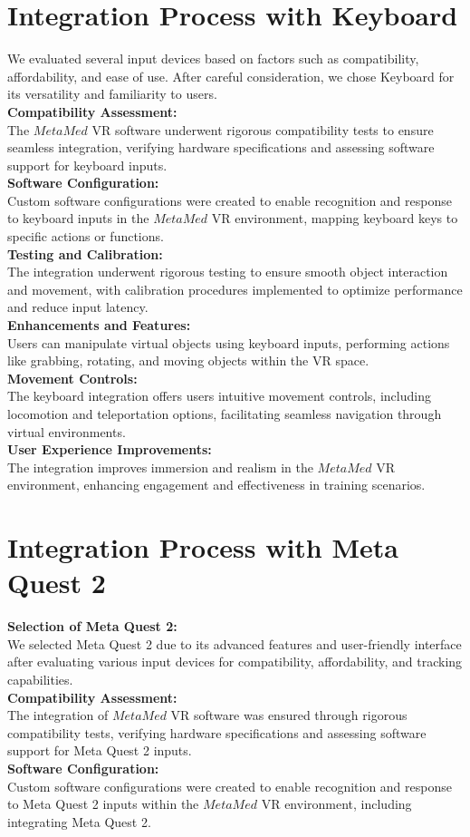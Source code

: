 \section{Integration Process with Keyboard}
We evaluated several input devices based on factors such as compatibility, affordability, and ease of use. After careful consideration, we chose Keyboard for its versatility and familiarity to users.\\
\textbf{Compatibility Assessment:}\\
The $MetaMed$ VR software underwent rigorous compatibility tests to ensure seamless integration, verifying hardware specifications and assessing software support for keyboard inputs.\\
\textbf{Software Configuration:}\\
Custom software configurations were created to enable recognition and response to keyboard inputs in the $MetaMed$ VR environment, mapping keyboard keys to specific actions or functions.\\
\textbf{Testing and Calibration:}\\
The integration underwent rigorous testing to ensure smooth object interaction and movement, with calibration procedures implemented to optimize performance and reduce input latency.\\
\textbf{Enhancements and Features:}\\ 
Users can manipulate virtual objects using keyboard inputs, performing actions like grabbing, rotating, and moving objects within the VR space.\\
\textbf{Movement Controls:}\\
The keyboard integration offers users intuitive movement controls, including locomotion and teleportation options, facilitating seamless navigation through virtual environments.\\
\textbf{User Experience Improvements:}\\
The integration improves immersion and realism in the $MetaMed$ VR environment, enhancing engagement and effectiveness in training scenarios.
\section{Integration Process with Meta Quest 2}
\textbf{Selection of Meta Quest 2:}\\
We selected Meta Quest 2 due to its advanced features and user-friendly interface after evaluating various input devices for compatibility, affordability, and tracking capabilities.\\
\textbf{Compatibility Assessment:}\\
The integration of $MetaMed$ VR software was ensured through rigorous compatibility tests, verifying hardware specifications and assessing software support for Meta Quest 2 inputs.\\
\textbf{Software Configuration:}\\
Custom software configurations were created to enable recognition and response to Meta Quest 2 inputs within the $MetaMed$ VR environment, including integrating Meta Quest 2.
